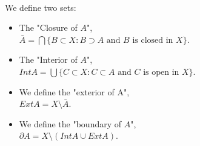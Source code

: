 \documentclass{article}
\begin{document}
\\
We define two sets:
\begin{itemize}
    \item The "Closure of $A$",\\
    $\bar{A}=\bigcap\{B\subset X: B\supset A \text{ and } B \text{ is closed in $X$}\}$.
    \item The "Interior of $A$",\\
    $Int A=\bigcup\{C\subset X: C \subset A \text{ and $C$ is open in $X$}\}$.
    \item We define the "exterior of A",\\
    $ExtA=X\setminus\bar{A}$.
    \item We define the "boundary of $A$",\\
    $\partial A=X\setminus (IntA\cup ExtA)$.
\end{itemize}
\end{document}
